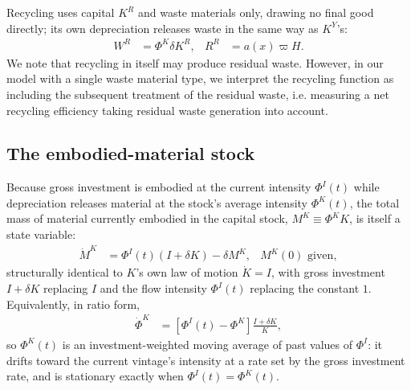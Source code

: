  Recycling uses capital $K^R$ and waste materials only, drawing no final good directly; its own depreciation releases waste in the same way as $K^Y$'s:
\begin{align}
W^R &= \Phi^K\delta K^R, & R^R &= a\!\left(x\right)\varpi H.
\label{eq:sp:setup:recycling-mass}
\end{align}
We note that recycling in itself may produce residual waste. However, in our model with a single waste material type, we interpret the recycling function as including the subsequent treatment of the residual waste, i.e. measuring a net recycling efficiency taking residual waste generation into account. 

\subsection{The embodied-material stock}
\label{sec:sp:setup:embodied-stock}
Because gross investment is embodied at the current intensity $\Phi^I(t)$ while depreciation releases material at the stock's average intensity $\Phi^K(t)$, the total mass of material currently embodied in the capital stock, $M^K\equiv\Phi^KK$, is itself a state variable:
\begin{align}
\dot M^K &= \Phi^I(t)\left(I+\delta K\right)-\delta M^K,
&
M^K(0) \text{ given},
\label{eq:sp:setup:Phi-motion}
\end{align}
structurally identical to $K$'s own law of motion $\dot K=I$, with gross investment $I+\delta K$ replacing $I$ and the flow intensity $\Phi^I(t)$ replacing the constant $1$. Equivalently, in ratio form,
\begin{align}
\dot\Phi^K &= \left[\Phi^I(t)-\Phi^K\right]\frac{I+\delta K}{K},
\label{eq:sp:setup:phiK-motion}
\end{align}
so $\Phi^K(t)$ is an investment-weighted moving average of past values of $\Phi^I$: it drifts toward the current vintage's intensity at a rate set by the gross investment rate, and is stationary exactly when $\Phi^I(t)=\Phi^K(t)$.


